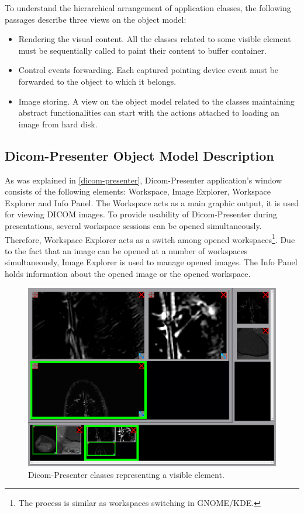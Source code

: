 To understand the hierarchical arrangement of application classes, the following passages describe three views on the object model:

\begin{itemize}
\item Rendering the visual content. All the classes related to some visible element must be sequentially called to paint their content to buffer container.
\item Control events forwarding. Each captured pointing device event must be forwarded to the object to which it belongs.
\item Image storing. A view on the object model related to the classes maintaining abstract functionalities can start with the actions attached to loading an image from hard disk.
\end{itemize}

\subsection{Dicom-Presenter Object Model Description}
As was explained in \ref{dicom-presenter}, Dicom-Presenter application's window consists of the following elements:  Workspace, Image Explorer, Workspace Explorer and Info Panel. The Workspace acts as a main graphic output, it is used for viewing DICOM images. To provide usability of Dicom-Presenter during presentations, several workspace sessions can be opened simultaneously. Therefore, Workspace Explorer acts as a switch among opened workspaces\footnote{The process is similar as workspaces switching in GNOME/KDE.}. Due to the fact that an image can be opened at a number of workspaces simultaneously, Image Explorer is used to manage opened images. The Info Panel holds information about the opened image or the opened workspace.

\begin{figure}
	\caption{Dicom-Presenter classes representing a visible element.}
	\begin{center}
	\includegraphics[width=\textwidth]{Text/IMG/dicom-presenter-gui.png}
	\end{center}
	\label{paint}
\end{figure}

